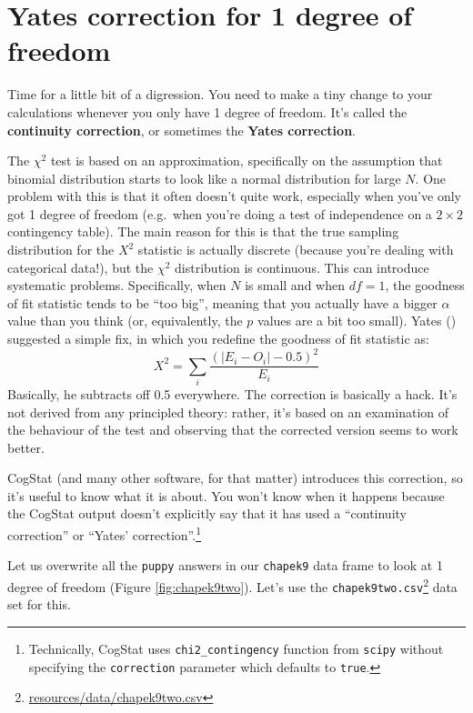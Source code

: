 \documentclass[
  11pt,
  a4paper,
  twoside,symmetric,openright]{book}
\theoremstyle{break}
\theoremstyle{break}
\DeclareRobustCommand{\href}[2]{#2\footnote{\url{#1}}}
\begin{document}
\section{Yates correction for 1 degree of freedom}\label{yates}

Time for a little bit of a digression. You need to make a tiny change to your calculations whenever you only have 1 degree of freedom. It's called the \textbf{continuity correction}, or sometimes the \textbf{Yates correction}.

The \(\chi^2\) test is based on an approximation, specifically on the assumption that binomial distribution starts to look like a normal distribution for large \(N\). One problem with this is that it often doesn't quite work, especially when you've only got 1 degree of freedom (e.g.~when you're doing a test of independence on a \(2 \times 2\) contingency table). The main reason for this is that the true sampling distribution for the \(X^2\) statistic is actually discrete (because you're dealing with categorical data!), but the \(\chi^2\) distribution is continuous. This can introduce systematic problems. Specifically, when \(N\) is small and when \(df=1\), the goodness of fit statistic tends to be ``too big'', meaning that you actually have a bigger \(\alpha\) value than you think (or, equivalently, the \(p\) values are a bit too small). Yates () suggested a simple fix, in which you redefine the goodness of fit statistic as:
\[
X^2 = \sum_{i} \frac{(|E_i - O_i| - 0.5)^2}{E_i}
\]
Basically, he subtracts off 0.5 everywhere. The correction is basically a hack. It's not derived from any principled theory: rather, it's based on an examination of the behaviour of the test and observing that the corrected version seems to work better.

CogStat (and many other software, for that matter) introduces this correction, so it's useful to know what it is about. You won't know when it happens because the CogStat output doesn't explicitly say that it has used a ``continuity correction'' or ``Yates' correction''.\footnote{Technically, CogStat uses \texttt{chi2\_contingency} function from \texttt{scipy} without specifying the \texttt{correction} parameter which defaults to \texttt{true}.}

Let us overwrite all the \texttt{puppy} answers in our \texttt{chapek9} data frame to look at 1 degree of freedom (Figure \ref{fig:chapek9two}). Let's use the \href{resources/data/chapek9two.csv}{\texttt{chapek9two.csv}} data set for this.
\end{document}
